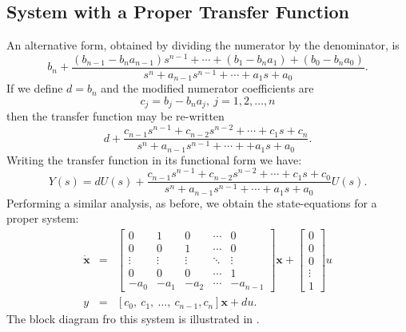 \subsection*{System with a Proper Transfer Function}
\ifslidesonly
\begin{slide}

\end{slide}
\fi

An alternative form, obtained by dividing the numerator by the
denominator, is
\[b_n+\frac{(b_{n-1} - b_n a_{n-1})s^{n-1}+\cdots+(b_1 - b_n a_1)+(b_0 - b_n a_0)}{s^n+a_{n-1}s^{n-1}+\cdots+a_1s + a_0}.\]
If we define $d=b_n$ and the modified numerator coefficients are
\[c_j=b_j - b_n a_j,\ j=1,2,\ldots,n\] then the transfer function may be
re-written
\[d+\frac{c_{n-1}s^{n-1}+c_{n-2}s^{n-2}+\cdots+c_1s + c_n}{s^n+a_{n-1}s^{n-1}+\cdots++a_1s + a_0}.\]
Writing the transfer function in its functional form we have:
\[Y(s)=d U(s) +\frac{c_{n-1}s^{n-1}+c_{n-2}s^{n-2}+\cdots+c_1s +
c_0}{s^n+a_{n-1}s^{n-1}+\cdots+a_1s + a_0}U(s).\] Performing a
similar analysis, as before, we obtain the state-equations for a
proper system:
\begin{eqnarray*}\dot{\mathbf{x}} & = & \left[\begin{array}{ccccc}
  0 & 1 & 0 & \cdots & 0 \\
  0 & 0 & 1 & \cdots & 0 \\
  \vdots & \vdots & \vdots & \ddots & \vdots \\
  0 & 0 & 0 & \cdots & 1 \\
  -a_{0} & -a_{1} & -a_{2} & \cdots & -a_{n-1}
\end{array}\right]\mathbf{x}+\left[\begin{array}{c}
  0 \\
  0 \\
  0 \\
  \vdots \\
  1
\end{array}\right]u\\
y & = & [c_0,\ c_1,\ \dots,\ c_{n-1}, c_n] \mathbf{x} + d
u.\end{eqnarray*} The block diagram fro this system is illustrated
in .
\begin{slide}\label{slide:proper}
\end{slide}



